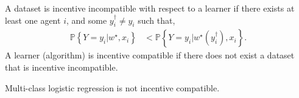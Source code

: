 \documentclass{article}
\begin{document}
\begin{df} \label{df:ic} 
A dataset is incentive incompatible with respect to a learner if there exists at least one agent $i $, and some $y^{\dagger}_{i} \neq  y_{i}$ such that,
\begin{align*}
\mathbb{P}\left\{Y = y_{i} | w^\star , x_{i}\right\} &< \mathbb{P}\left\{Y = y_{i} | w^\star \left(y^{\dagger}_{i}\right), x_{i}\right\}.
\end{align*}
A learner (algorithm) is incentive compatible if there does not exist a dataset that is incentive incompatible.
\newline \newline\end{df}
\begin{prop} \label{prop:logit} 
Multi-class logistic regression is not incentive compatible.
\newline \newline\end{prop}
\end{document}
